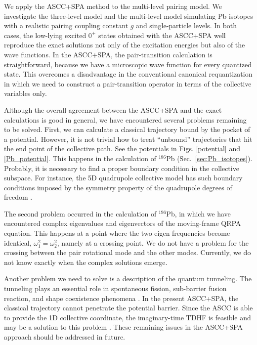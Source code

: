 \documentclass[%
superscriptaddress,
showpacs,
nofootinbib,
amsmath,amssymb,
aps,
prc,
twocolumn,
floatfix ]%
{revtex4-1}
\begin{document}

We apply the ASCC+SPA method to the multi-level pairing model.
We investigate the three-level model and 
the multi-level model simulating Pb isotopes
with a realistic pairing coupling constant $g$ and single-particle levels.
In both cases, the low-lying excited $0^+$ states obtained with
the ASCC+SPA well reproduce the exact solutions
not only of the excitation energies but also of the wave functions.
In the ASCC+SPA, the pair-transition calculation is straightforward,
because we have a microscopic wave function for every quantized state.
This overcomes a disadvantage in the conventional canonical requantization
in which we need to construct a pair-transition operator
in terms of the collective variables only.

Although the overall agreement between the ASCC+SPA and the exact
calculations is good in general,
we have encountered several problems remaining to be solved.
First, we can calculate a classical trajectory bound by the
pocket of a potential. However, it is not trivial how to treat
``unbound'' trajectories that hit the end point of the collective path.
See the potentials in Figs. \ref{potential} and \ref{Pb_potential}.
This happens in the calculation of ${}^{186}$Pb
(Sec.~\ref{sec:Pb_isotopes}).
Probably, it is necessary to find a proper boundary condition
in the collective subspace.
For instance, the 5D quadrupole collective model has
such boundary conditions imposed by the symmetry property of
the quadrupole degrees of freedom \cite{KB67}.

The second problem occurred in the calculation of $^{196}$Pb,
in which we have encountered complex eigenvalues and eigenvectors
of the moving-frame QRPA equation.
This happens at a point where the two eigen frequencies become
identical, $\omega_1^2=\omega_2^2$, namely at a crossing point.
We do not have a problem for the crossing between the pair rotational
mode and the other modes.
Currently, we do not know exactly when the complex solutions emerge.

Another problem we need to solve is a description of the
quantum tunneling.
The tunneling plays an essential role in
spontaneous fission, sub-barrier fusion reaction, and
shape coexistence phenomena \cite{NMMY16,WN16,WN17,HNMM07,HNMM08}.
In the present ASCC+SPA, the classical trajectory
cannot penetrate the potential barrier.
Since the ASCC is able to provide the 1D collective coordinate,
the imaginary-time TDHF is feasible and may be a solution
to this problem \cite{Neg82}.
These remaining issues in the ASCC+SPA approach should be
addressed in future.
\end{document}
